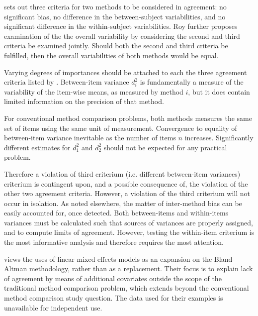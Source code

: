 \documentclass[12pt, a4paper]{report}
\theoremstyle{plain}
\theoremstyle{definition}
\theoremstyle{remark}
\begin{document}
\citet{Barnhart} sets out three criteria for two methods to be considered in agreement: no significant bias, no difference in the between-subject variabilities, and no significant difference in the within-subject variabilities. Roy further proposes examination of the the overall variability by considering the second and third criteria be examined jointly. Should both the second and third criteria be fulfilled, then the overall variabilities of both methods would be equal.
	
	Varying degrees of importances should be attached to each the three agreement criteria listed by \citet{Barnhart}. Between-item variance $d^2_i$ is fundamentally a measure of the variability of the item-wise means, as measured by method $i$, but it does contain limited information on the precision of that method. 
	
	For conventional method comparison problems, both methods measures the same set of items using the same unit of measurement. Convergence to equality of between-item variance inevitable as the number of items $n$ increases. Significantly different estimates for $d^2_1$ and $d^2_2$ should not be expected for any practical problem. 
	
	Therefore a violation of third criterium (i.e. different between-item variances) criterium is contingent upon, and a  
	possible consequence of, the violation of the other two agreement criteria. However, a violation of the third criterium will not occur in isolation. As noted elsewhere, the matter of inter-method bias can be easily accounted for, once detected. Both between-items and within-items variances must be calculated such that sources of variances are properly assigned, and to compute limits of agreement. However, testing the within-item criterium is the most informative analysis and therefore requires the most attention. 

	
	
	
	\citet{LaiShiao} views
	the uses of linear mixed effects models as an expansion on the
	Bland-Altman methodology, rather than as a replacement.  Their focus is to explain lack of agreement by means of additional covariates outside the scope of the traditional method comparison problem, which extends beyond the conventional method comparison study question. The data used for their examples is unavailable for independent use. 
	
\end{document}
